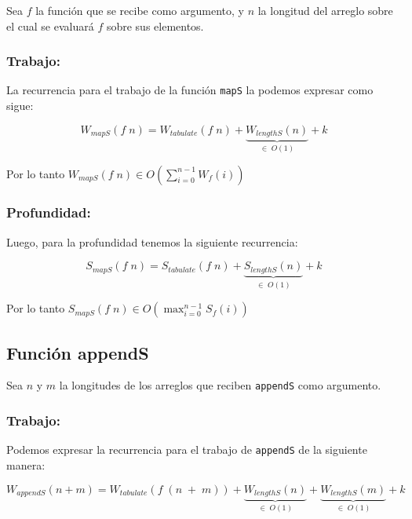 \documentclass[11pt]{article}
\begin{document}
Sea $f$ la función que se recibe como argumento, y $n$ la longitud del arreglo
sobre el cual se evaluará $f$ sobre sus elementos.
\subsubsection{Trabajo:}
 
La recurrencia para el trabajo de la función \texttt{mapS} la podemos
expresar como sigue:

\begin{equation*}
    W_{mapS}(f \; n) = W_{tabulate}(f \; n) + \underbrace{W_{lengthS}(n)}_{\in \; O(1)} + k
\end{equation*} 

Por lo tanto $ W_{mapS}(f \; n) \in O\left(\displaystyle\sum_{i=0}^{n - 1}W_f(i)\right) $

\subsubsection{Profundidad:}

Luego, para la profundidad tenemos la siguiente recurrencia:

\begin{equation*}
    S_{mapS}(f \; n) = S_{tabulate}(f \; n) + \underbrace{S_{lengthS}(n)}_{\in \; O(1)} + k
\end{equation*} 

Por lo tanto $ S_{mapS}(f \; n) \in O\left(\displaystyle\max_{i=0}^{n - 1}S_f(i)\right) $


\subsection{Función appendS}
Sea $n$ y $m$ la longitudes de los arreglos que reciben \texttt{appendS} como
argumento. 
\subsubsection{Trabajo:}

Podemos expresar la recurrencia para el trabajo de \texttt{appendS} de 
la siguiente manera:

\begin{equation*}
    W_{appendS}(n + m) = W_{tabulate}(f \; (n \; +\; m)) + \underbrace{W_{lengthS}(n)}_{\in \; O(1)}
    + \underbrace{W_{lengthS}(m)}_{\in \; O(1)} + k
\end{equation*}
\end{document}
